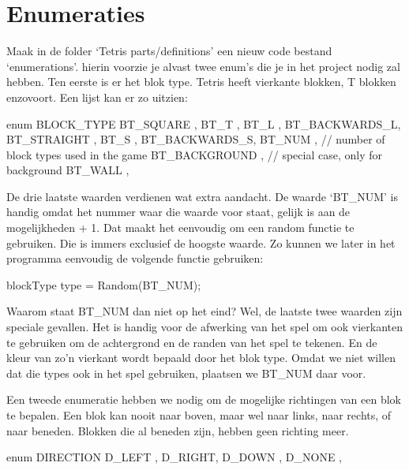 \section{Enumeraties}
Maak in de folder `Tetris parts/definitions' een nieuw code bestand `enumerations'. hierin voorzie je alvast twee enum's die je in het project nodig zal hebben. Ten eerste is er het blok type. Tetris heeft vierkante blokken, T blokken enzovoort. Een lijst kan er zo uitzien:

\begin{code}
enum BLOCK_TYPE
{
   BT_SQUARE     ,
   BT_T          ,
   BT_L          ,
   BT_BACKWARDS_L,
   BT_STRAIGHT   ,
   BT_S          ,
   BT_BACKWARDS_S,
   BT_NUM        , // number of block types used in the game
   BT_BACKGROUND , // special case, only for background
   BT_WALL       ,      
}
\end{code}

De drie laatste waarden  verdienen wat extra aandacht. De waarde `BT\_NUM' is handig omdat het nummer waar die waarde voor staat, gelijk is aan de mogelijkheden + 1. Dat maakt het eenvoudig om een random functie te gebruiken. Die is immers exclusief de hoogste waarde. Zo kunnen we later in het programma eenvoudig de volgende functie gebruiken:

\begin{code}
blockType type = Random(BT_NUM);
\end{code}

Waarom staat BT\_NUM dan niet op het eind? Wel, de laatste twee waarden zijn speciale gevallen. Het is handig voor de afwerking van het spel om ook vierkanten te gebruiken om de achtergrond en de randen van het spel te tekenen. En de kleur van zo'n vierkant wordt bepaald door het blok type. Omdat we niet willen dat die types ook in het spel gebruiken, plaatsen we BT\_NUM daar voor.

Een tweede enumeratie hebben we nodig om de mogelijke richtingen van een blok te bepalen. Een blok kan nooit naar boven, maar wel naar links, naar rechts, of naar beneden. Blokken die al beneden zijn, hebben geen richting meer.

\begin{code}
enum DIRECTION
{
   D_LEFT ,
   D_RIGHT,
   D_DOWN ,
   D_NONE ,
}
\end{code}
